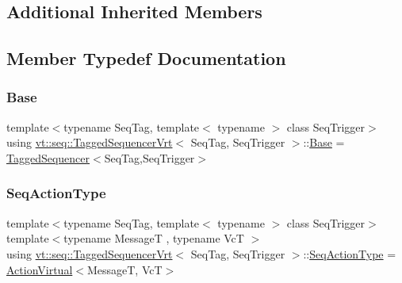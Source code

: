 \subsection*{Additional Inherited Members}


\subsection{Member Typedef Documentation}
\mbox{\label{structvt_1_1seq_1_1_tagged_sequencer_vrt_abef9929f24652d9ff758a98e44961263}} 
\subsubsection{\texorpdfstring{Base}{Base}}
{\footnotesize\ttfamily template$<$typename Seq\+Tag, template$<$ typename $>$ class Seq\+Trigger$>$ \\
using \hyperlink{structvt_1_1seq_1_1_tagged_sequencer_vrt}{vt\+::seq\+::\+Tagged\+Sequencer\+Vrt}$<$ Seq\+Tag, Seq\+Trigger $>$\+::\hyperlink{structvt_1_1seq_1_1_tagged_sequencer_vrt_abef9929f24652d9ff758a98e44961263}{Base} =  \hyperlink{structvt_1_1seq_1_1_tagged_sequencer}{Tagged\+Sequencer}$<$Seq\+Tag,Seq\+Trigger$>$}

\mbox{\label{structvt_1_1seq_1_1_tagged_sequencer_vrt_af7a8c4c1f5e352fb6d817b51fbf098d6}} 
\subsubsection{\texorpdfstring{Seq\+Action\+Type}{SeqActionType}}
{\footnotesize\ttfamily template$<$typename Seq\+Tag, template$<$ typename $>$ class Seq\+Trigger$>$ \\
template$<$typename MessageT , typename VcT $>$ \\
using \hyperlink{structvt_1_1seq_1_1_tagged_sequencer_vrt}{vt\+::seq\+::\+Tagged\+Sequencer\+Vrt}$<$ Seq\+Tag, Seq\+Trigger $>$\+::\hyperlink{structvt_1_1seq_1_1_tagged_sequencer_a0210dbd34288d440e0cd51db9d6637bd}{Seq\+Action\+Type} =  \hyperlink{structvt_1_1seq_1_1_action_virtual}{Action\+Virtual}$<$MessageT, VcT$>$}

